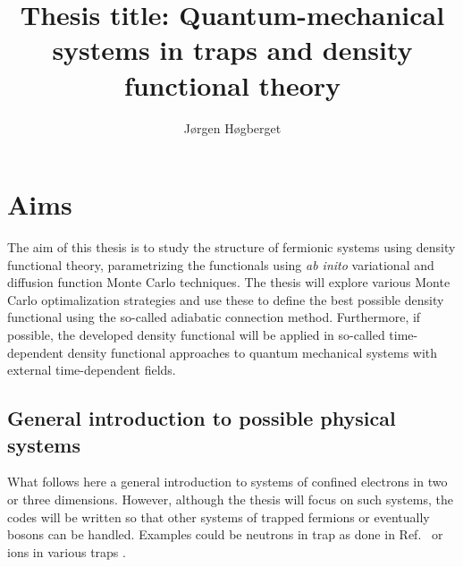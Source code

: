 \documentclass[twocolumn]{revtex4}
\begin{document}
\title{Thesis title: Quantum-mechanical systems in traps and density functional theory}
\author{J\o rgen H\o gberget}
\maketitle
\section*{Aims}
The aim of this thesis is to study the structure of fermionic systems using
density functional theory, parametrizing the functionals using {\em ab inito} 
variational and diffusion function Monte Carlo techniques. The thesis will explore various Monte Carlo
optimalization strategies and use these to define the best possible density functional using the so-called adiabatic connection method.
Furthermore, if possible, the developed density functional will be applied in so-called time-dependent density functional approaches
to quantum mechanical systems with external time-dependent fields.

\subsection*{General introduction to possible physical systems}

What follows here a general introduction to systems of confined electrons in two or three dimensions.
However, although the thesis will focus on such systems, the codes will be written so that other systems of trapped 
fermions or eventually bosons can be handled. Examples could be neutrons in trap as done in Ref.~\cite{bogner2011} or ions in various traps \cite{yoram2008}.  
\end{document}
